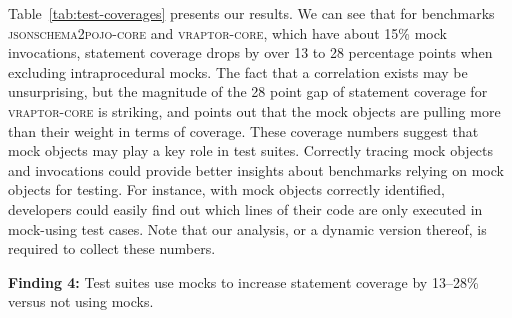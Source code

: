 Table~\ref{tab:test-coverages} presents our results. We can see that for benchmarks \textsc{jsonschema2pojo-core} and \textsc{vraptor-core}, which have about 15\% mock invocations, statement coverage drops by over 13 to 28 percentage points when excluding intraprocedural mocks. The fact that a correlation exists may be unsurprising, but the magnitude of the 28 point gap of statement coverage for \textsc{vraptor-core} is striking, and points out that the mock objects are pulling more than their weight in terms of coverage. These coverage numbers suggest that mock objects may play a key role in test suites. Correctly tracing mock objects and invocations could provide better insights about benchmarks relying on mock objects for testing. For instance, with mock objects correctly identified, developers could easily find out which lines of their code are only executed in mock-using test cases. Note that our analysis, or a dynamic version thereof, is required to collect these numbers.

\begin{mdframed}[
	leftmargin=\parindent,
	rightmargin=\parindent,
	skipabove=\topsep,
	skipbelow=\topsep
	]
	{\bf Finding 4:} Test suites use mocks to increase statement coverage by 13--28\% versus not using mocks.
\end{mdframed}






